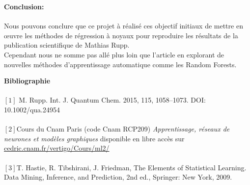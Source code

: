\documentclass[a4paper,12pt,titlepage]{report}
\begin{document}
\newpage
\textbf{\Huge Conclusion:} \\
\paragraph{}
Nous pouvons conclure que ce projet à réalisé ces objectif initiaux de mettre en œuvre les méthodes de régression à noyaux pour reproduire les résultats de la publication scientifique de Mathias Rupp. \\
Cependant nous ne somme pas allé plus loin que l'article en explorant de nouvelles méthodes d'apprentissage automatique comme les Random Forests.

\newpage
\Large \textbf{Bibliographie} \normalsize \\
\paragraph{}
\vspace{2cm}
$[1]$ M. Rupp. Int. J. Quantum Chem. 2015, 115, 1058–1073. DOI: 10.1002/qua.24954

\paragraph{}
$[2]$Cours du Cnam Paris (code Cnam RCP209) 
\textit{Apprentissage, réseaux 
de neurones et modèles graphiques} disponible en libre accès sur 
\url{cedric.cnam.fr/vertigo/Cours/ml2/}
\paragraph{}
$[3]$T. Hastie, R. Tibshirani, J. Friedman, The Elements of Statistical Learning. Data Mining, Inference, and Prediction, 2nd ed., Springer: New York, 2009.
\end{document}
